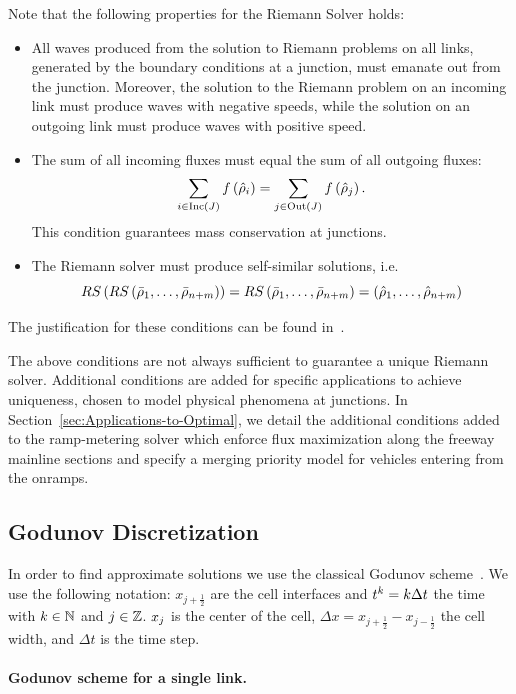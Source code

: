 Note that the following properties for the Riemann Solver holds:
\begin{itemize}
\item All waves produced from the solution to Riemann problems on all links,
generated by the boundary conditions at a junction, must emanate out
from the junction. Moreover, the solution to the Riemann problem
on an incoming link must produce waves with negative speeds, while
the solution on an outgoing link must produce waves with positive
speed. 
\item The sum of all incoming fluxes must equal the sum of all outgoing
fluxes: 
\[
\sum_{i\in\text{Inc}\left(J\right)}f\left(\hat{\rho}_{i}\right)=\sum_{j\in\text{Out}\left(J\right)}f\left(\hat{\rho}_{j}\right).
\]
This condition guarantees mass conservation at junctions.
\item The Riemann solver must produce self-similar solutions, i.e. 
\[
RS\left(RS\left(\bar{\rho}_{1},\ldots,\bar{\rho}_{n+m}\right)\right)=RS\left(\bar{\rho}_{1},\ldots,\bar{\rho}_{n+m}\right)=\left(\hat{\rho}_{1},\ldots,\hat{\rho}_{n+m}\right)
\]
\end{itemize}

The justification for these conditions can be found in~\cite{garavello2006traffic}.

The above conditions are not always sufficient to guarantee a unique Riemann solver. Additional conditions are added for specific applications to achieve uniqueness, chosen to model physical phenomena at junctions. In Section~\ref{sec:Applications-to-Optimal}, we detail the additional conditions added to the ramp-metering solver which enforce flux maximization along the freeway mainline sections and specify a merging priority model for vehicles entering from the onramps.


\subsection{Godunov Discretization\label{sub:Godunov-Discretization}}

In order to find approximate solutions we use the classical Godunov scheme~\cite{godunov1959}. We use the following notation: $x_{j+\frac{1}{2}}$ are the cell interfaces and   $t^{k}=k\Delta t$ the time with $k\in\mathbb{N}$ and $j\in\mathbb{Z}$. $x_{j}$ is the center of the cell, $\Delta x=x_{j+\frac{1}{2}}-x_{j-\frac{1}{2}}$ the cell width, and $\Delta t$ is the time step. 
\paragraph{Godunov scheme for a single link.}

